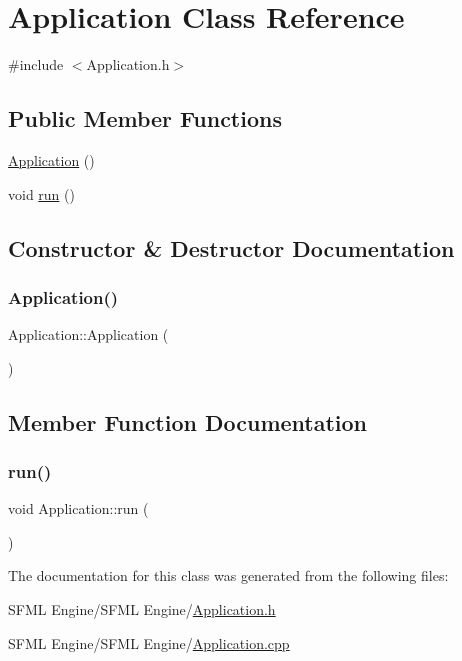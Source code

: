 \hypertarget{class_application}{}\section{Application Class Reference}
\label{class_application}


{\ttfamily \#include $<$Application.\+h$>$}

\subsection*{Public Member Functions}
\begin{DoxyCompactItemize}
\item 
\hyperlink{class_application_afa8cc05ce6b6092be5ecdfdae44e05f8}{Application} ()
\item 
void \hyperlink{class_application_a68965449404743bf1add056784d6cf81}{run} ()
\end{DoxyCompactItemize}


\subsection{Constructor \& Destructor Documentation}
\hypertarget{class_application_afa8cc05ce6b6092be5ecdfdae44e05f8}{}\label{class_application_afa8cc05ce6b6092be5ecdfdae44e05f8} 
\subsubsection{\texorpdfstring{Application()}{Application()}}
{\footnotesize\ttfamily Application\+::\+Application (\begin{DoxyParamCaption}{ }\end{DoxyParamCaption})}



\subsection{Member Function Documentation}
\hypertarget{class_application_a68965449404743bf1add056784d6cf81}{}\label{class_application_a68965449404743bf1add056784d6cf81} 
\subsubsection{\texorpdfstring{run()}{run()}}
{\footnotesize\ttfamily void Application\+::run (\begin{DoxyParamCaption}{ }\end{DoxyParamCaption})}



The documentation for this class was generated from the following files\+:\begin{DoxyCompactItemize}
\item 
S\+F\+M\+L Engine/\+S\+F\+M\+L Engine/\hyperlink{_application_8h}{Application.\+h}\item 
S\+F\+M\+L Engine/\+S\+F\+M\+L Engine/\hyperlink{_application_8cpp}{Application.\+cpp}\end{DoxyCompactItemize}
